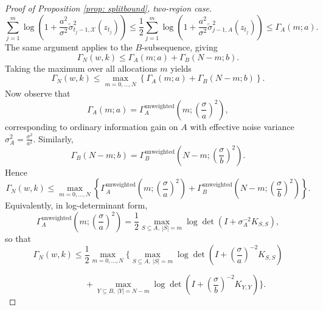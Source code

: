 \begin{proof}[Proof of Proposition \ref{prop: splitbound}, two-region case]
\begin{equation*}
\sum_{j=1}^m
\log\!\left(
1+
\frac{a^2}{\sigma^2}
\tilde{\sigma}_{t_j-1,\mathcal{X}}^2(z_{t_j})
\right)
\leq \frac{1}{2}
\sum_{j=1}^m
\log\!\left(
1+
\frac{a^2}{\sigma^2}
\tilde{\sigma}_{j-1,A}^2(z_{t_j})
\right)
\leq
\Gamma_A(m;a).
\end{equation*}
The same argument applies to the $B$-subsequence, giving
\begin{equation*}
\Gamma_N(w,k)
\leq
\Gamma_A(m;a)
+
\Gamma_B(N-m;b).
\end{equation*}
Taking the maximum over all allocations $m$ yields
\begin{equation*}
\Gamma_N(w,k)
\leq
\max_{m=0,\dots,N}
\left\{
\Gamma_A(m;a)
+
\Gamma_B(N-m;b)
\right\}.
\end{equation*}
Now observe that
\begin{equation*}
\Gamma_A(m;a)
=
\Gamma_A^{\mathrm{unweighted}}
\!\left(
m;
\left(\frac{\sigma}{a}\right)^2
\right),
\end{equation*}
corresponding to ordinary information gain on $A$ with effective noise variance
$\sigma_A^2
=
\frac{\sigma^2}{a^2}.$
Similarly,
\begin{equation*}
\Gamma_B(N-m;b)
=
\Gamma_B^{\mathrm{unweighted}}
\!\left(
N-m;
\left(\frac{\sigma}{b}\right)^2
\right).
\end{equation*}
Hence
\begin{equation*}
\Gamma_N(w,k)
\leq
\max_{m=0,\dots,N}
\left\{
\Gamma_A^{\mathrm{unweighted}}
\!\left(
m;
\left(\frac{\sigma}{a}\right)^2
\right)
+
\Gamma_B^{\mathrm{unweighted}}
\!\left(
N-m;
\left(\frac{\sigma}{b}\right)^2
\right)
\right\}.
\end{equation*}
Equivalently, in log-determinant form,
\begin{equation*}
\Gamma_A^{\mathrm{unweighted}}
\!\left(
m;
\left(\frac{\sigma}{a}\right)^2
\right)
= \frac{1}{2}
\max_{S\subseteq A,\ |S|=m}
\log\det
\left(
I+\sigma_A^{-2}K_{S,S}
\right),
\end{equation*}
so that
\begin{equation*}
\Gamma_N(w,k)
\leq \frac{1}{2}
\max_{m=0,\dots,N}
\Bigg\{
\max_{S\subseteq A,\ |S|=m}
\log\det
\left(
I+\left(\frac{\sigma}{a}\right)^{-2}
K_{S,S}
\right)
\end{equation*}

\begin{equation*}
\qquad\qquad
+
\max_{Y\subseteq B,\ |Y|=N-m}
\log\det
\left(
I+\left(\frac{\sigma}{b}\right)^{-2}
K_{Y,Y}
\right)
\Bigg\}.
\end{equation*}
\end{proof}


